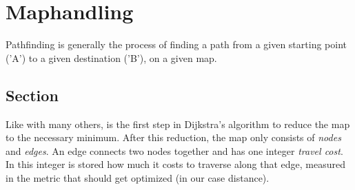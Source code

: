 \chapter{Maphandling}\label{ch:map}
Pathfinding is generally the process of finding a path from a given starting point ('A')
to a given destination ('B'),
on a given map.

\section{Section}\label{sec:map}
Like with many others,
is the first step in Dijkstra's algorithm to reduce the map to the necessary minimum.
After this reduction, the map only consists of \emph{nodes} and \emph{edges}.
An edge connects two nodes together and has one integer \emph{travel cost}.
In this integer is stored how much it costs to traverse along that edge,
measured in the metric that should get optimized (in our case distance).

